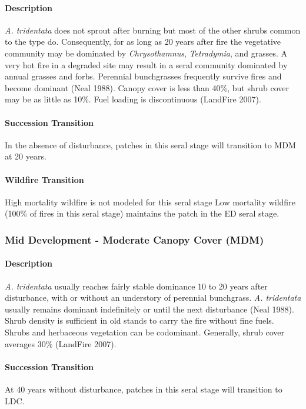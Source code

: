 \paragraph{Description} \emph{A. tridentata} does not sprout after burning but most of the other shrubs common to the type do. Consequently, for as long as 20 years after fire the vegetative community may be dominated by \emph{Chrysothamnus}, \emph{Tetradymia}, and grasses. A very hot fire in a degraded site may result in a seral community dominated by annual grasses and forbs. Perennial bunchgrasses frequently survive fires and become dominant (Neal 1988). Canopy cover is less than 40\%, but shrub cover may be as little as 10\%. Fuel loading is discontinuous (LandFire 2007).

\paragraph{Succession Transition} In the absence of disturbance, patches in this seral stage will transition to MDM at 20 years. 

\paragraph{Wildfire Transition} High mortality wildfire is not modeled for this seral stage Low mortality wildfire (100\% of fires in this seral stage) maintains the patch in the ED seral stage. 

\noindent\hrulefill


\subsubsection{Mid Development - Moderate Canopy Cover (MDM)}

\paragraph{Description} \emph{A. tridentata} usually reaches fairly stable dominance 10 to 20 years after disturbance, with or without an understory of perennial bunchgrass. \emph{A. tridentata} usually remains dominant indefinitely or until the next disturbance (Neal 1988). Shrub density is sufficient in old stands to carry the fire without fine fuels. Shrubs and herbaceous vegetation can be codominant. Generally, shrub cover averages 30\% (LandFire 2007).

\paragraph{Succession Transition} At 40 years without disturbance, patches in this seral stage will transition to LDC. 

